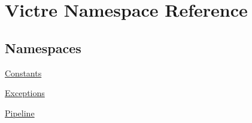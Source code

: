 \hypertarget{namespaceVictre}{\section{Victre Namespace Reference}
\label{namespaceVictre}
}
\subsection*{Namespaces}
\begin{DoxyCompactItemize}
\item 
\hyperlink{namespaceVictre_1_1Constants}{Constants}
\item 
\hyperlink{namespaceVictre_1_1Exceptions}{Exceptions}
\item 
\hyperlink{namespaceVictre_1_1Pipeline}{Pipeline}
\end{DoxyCompactItemize}
